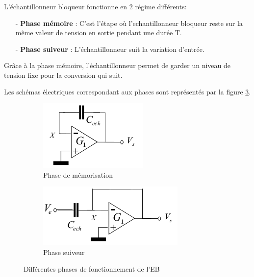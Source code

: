 \documentclass[11pt]{article}
\begin{document}
\medskip
L'\'echantillonneur bloqueur fonctionne en 2 r\'egime diff\'erents:
\begin{itemize}
  \item[-]\textbf{Phase m\'emoire} : C'est l'\'etape o\`u l'echantillonneur bloqueur
  reste sur la m\^eme valeur de tension en sortie pendant une dur\'ee T.
  \item[-]\textbf{Phase suiveur} : L'\'echantillonneur suit la variation d'entr\'ee.
\end{itemize}

Gr\^ace \`a la phase m\'emoire, l'\'echantillonneur permet de garder un niveau de tension
fixe pour la conversion qui suit.

Les sch\'emas \'electriques correspondant aux phases sont repr\'esent\'es par la figure \ref{fig:figEBfonct}.

\clearpage

\begin{figure}[!htb]
  \begin{subfigure}[t]{.5\linewidth}
      \centering
      \includegraphics[width=0.6\linewidth]{memoire_EB.png}
      \caption{Phase de m\'emorisation}
      \label{fig:sfigEBmem}
  \end{subfigure}%
  \begin{subfigure}[t]{.5\linewidth}
    \centering
    \includegraphics[width=0.6\linewidth]{suiveur_EB.png}
    \caption{Phase suiveur}
    \label{fig:sfigEBsuiv}
  \end{subfigure}%
  \caption{Diff\'erentes phases de fonctionnement de l'EB}
  \label{fig:figEBfonct}
\end{figure}
\end{document}

